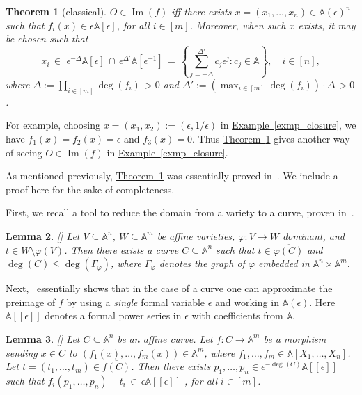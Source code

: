 \documentclass[11pt]{article}
\numberwithin{equation}{section}
\newtheorem{theorem}{Theorem}[section]
\newtheorem{lemma}[theorem]{Lemma}
\theoremstyle{definition}
\theoremstyle{plain}
\newcommand{\expref}[2]{\hyperref[#2]{#1~\ref{#2}}}
\newcommand{\aff}{\mathbb{A}}
\DeclareMathOperator{\im}{\mathrm{Im}}
\newcommand{\ol}[1]{\overline{#1}}
\begin{document}
\begin{theorem}[classical]\label{thm_approx}
$O\in \overline{\im(f)}$ iff there exists $x=(x_1,\dots,x_n)\in \aff(\epsilon)^n$ such that $f_i(x)\in \epsilon \aff[\epsilon]$, for all $i\in [m]$. Moreover, when such $x$ exists, it may be chosen such that
\[
x_i \,\in\,\, \epsilon^{-\Delta} \aff[\epsilon] \,\cap\, \epsilon^{\Delta'} \aff[\epsilon^{-1}] \,=\, \left\{\sum_{j=-\Delta}^{\Delta'} c_j \epsilon^j: c_j\in \aff\right\}, \quad i\in[n],
\]
where $\Delta:=\prod_{i\in[m]} \deg(f_i) \,>0$ and $\Delta':=(\max_{i\in[m]} \deg(f_i))\cdot \Delta \,>0$.
\end{theorem}

For example, choosing $x=(x_1,x_2):=(\epsilon, 1/\epsilon)$ in \expref{Example}{exmp_closure},  we have $f_1(x)=f_2(x)=\epsilon$ and $f_3(x)=0$. Thus \expref{Theorem}{thm_approx} gives another way of seeing  $O\in \ol{\im(f)}$ in \expref{Example}{exmp_closure}.

As mentioned previously, \expref{Theorem}{thm_approx} was  essentially proved  in~\cite{LL89}. We include a proof here for the sake of completeness.

First, we recall a tool to reduce the domain from a variety to a curve, proven in~\cite{LL89}.

\begin{lemma}
%
[{\cite[Proposition~1]{LL89}}] %
\label{lem_aux1}
Let $V\subseteq \aff^n$, $W\subseteq \aff^m$ be affine varieties, $\varphi: V\to W$ dominant, and $t\in W\setminus \varphi(V)$.
Then there exists a curve $C\subseteq \aff^n$ such that $t\in\overline{\varphi(C)}$ and $\deg(C)\leq \deg(\Gamma_\varphi)$, where $\Gamma_\varphi$ denotes the graph of $\varphi$ embedded in $\aff^n\times \aff^m$.
\end{lemma}

Next,~\cite{LL89} essentially shows that in the case of a curve one can approximate the preimage of $f$ by using a \emph{single} formal variable $\epsilon$ and working in $\aff(\epsilon)$. Here $\aff[[\epsilon]]$ denotes a formal power series in $\epsilon$ with coefficients from $\aff$.

\begin{lemma}
%
[{\cite[Corollary of Proposition~3]{LL89}}] %
\label{lem_aux2}
Let $C\subseteq \aff^n$ be an affine curve.  Let $f: C\to \aff^m$ be a morphism sending $x\in C$ to $(f_1(x),\dots,f_m(x))\in \aff^m$, where $f_1,\dots,f_m\in \aff[X_1,\dots,X_n]$. Let $t=(t_1,\dots,t_m)\in \overline{f(C)}$. Then there exists  $p_1,\dots,p_n\in \epsilon^{-\deg(C)}\aff[[\epsilon]]$ such that $f_i(p_1,\dots,p_n)-t_i \,\in\, \epsilon \aff[[\epsilon]]$ , for all $i\in [m]$.
\end{lemma}
\end{document}
